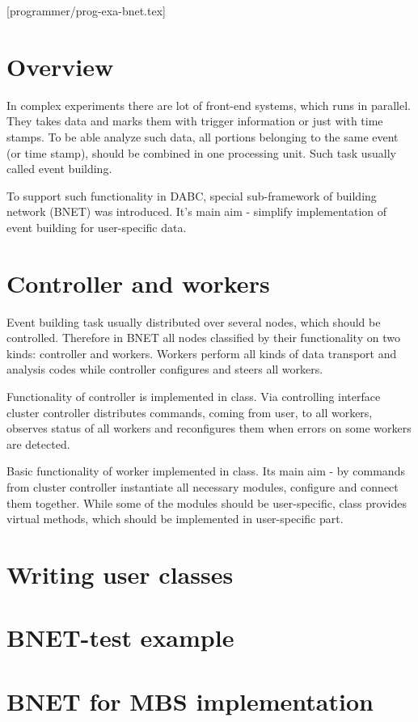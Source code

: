 [programmer/prog-exa-bnet.tex]

\section{Overview}

In complex experiments there are lot of front-end systems, which runs in parallel.
They takes data and marks them with trigger information or just with time stamps.
To be able analyze such data, all portions belonging to the same event (or time stamp),   
should be combined in one processing unit. Such task usually called event building.

To support such functionality in DABC, special sub-framework of building network (BNET) was introduced. 
It's main aim - simplify implementation of event building for user-specific data.
 



\section{Controller and workers}

Event building task usually distributed over several nodes, which should be controlled.
Therefore in BNET all nodes classified by their functionality on two kinds: controller and
workers. Workers perform all kinds of data transport and analysis codes while controller 
configures and steers all workers. 

Functionality of controller is implemented in  class.
Via controlling interface cluster controller distributes commands, coming from user,
to all workers, observes status of all workers and reconfigures them when errors on
some workers are detected.
 
Basic functionality of worker implemented in  class.
Its main aim - by commands from cluster controller instantiate all necessary modules, 
configure and connect them together. While some of the modules should be user-specific,
class provides virtual methods, which should be implemented in user-specific part. 


\section{Writing user classes}


\section{BNET-test example}


\section{BNET for MBS implementation}
